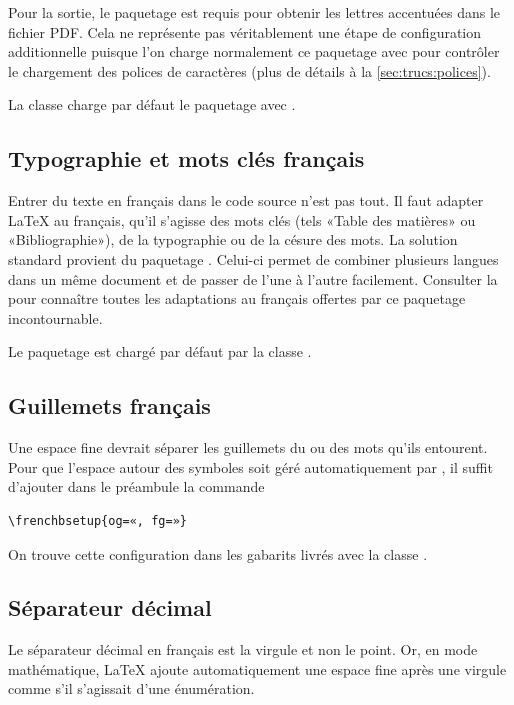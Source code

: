 Pour la sortie, le paquetage  \citep{fontspec} est
requis pour obtenir les lettres accentuées dans le fichier PDF. Cela ne
représente pas véritablement une étape de configuration additionnelle
puisque l'on charge normalement ce paquetage avec {\XeLaTeX} pour
contrôler le chargement des polices de caractères (plus de détails à
la \autoref{sec:trucs:polices}).

La classe  charge par défaut le paquetage
 avec {\XeLaTeX}.

\subsection{Typographie et mots clés français}
\label{sec:bases:francais:babel}

Entrer du texte en français dans le code source n'est pas tout. Il
faut adapter {\LaTeX} au français, qu'il s'agisse des mots clés (tels
«Table des matières» ou «Bibliographie»), de la typographie ou de la
césure des mots. La solution standard provient du paquetage
 \citep{babel}. Celui-ci permet de combiner plusieurs
langues dans un même document et de passer de l'une à l'autre
facilement. Consulter la %
pour connaître toutes les adaptations au français offertes par ce
paquetage incontournable.

Le paquetage  est chargé par défaut par la classe
.

\subsection{Guillemets français}
\label{sec:bases:francais:guillemets}

Une espace fine devrait séparer les guillemets du ou des mots qu'ils
entourent. Pour que l'espace autour des symboles soit géré
automatiquement par , il suffit d'ajouter dans le préambule
la commande
\begin{lstlisting}
\frenchbsetup{og=«, fg=»}
\end{lstlisting}
On trouve cette configuration dans les gabarits livrés avec la classe
.

\subsection{Séparateur décimal}
\label{sec:bases:francais:virgule}

Le séparateur décimal en français est la virgule et non le point. Or,
en mode mathématique, LaTeX ajoute automatiquement une espace fine
après une virgule comme s'il s'agissait d'une énumération.

